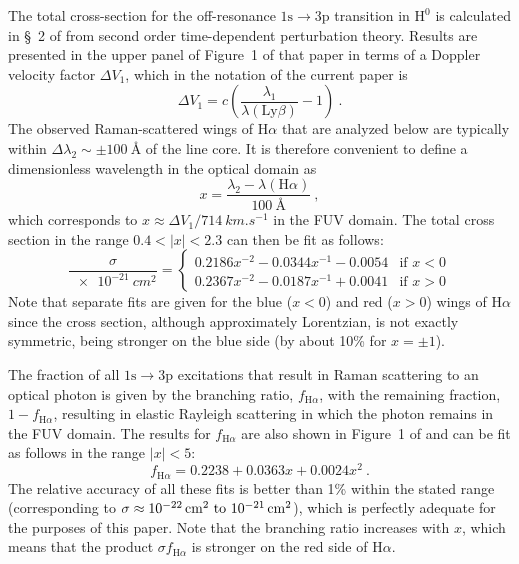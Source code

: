 \documentclass[twocolumn, times]{aastex63}
\newcommand*\chem[1]{\ensuremath{\mathrm{#1}}}
\newcommand\Config[1]{\ensuremath{\mathrm{#1}}}
\newcommand\ha{\ensuremath{\text{H}\alpha}}
\newcommand\lyb{\ensuremath{\text{Ly}\beta}}
\begin{document}
The total cross-section for the off-resonance \Config{1s \to 3p}
transition in \chem{H^0} is calculated in \S~2 of \citet{Chang:2015a}
from second order time-dependent perturbation theory. Results are
presented in the upper panel of Figure~1 of that paper in terms of a
Doppler velocity factor \(\Delta V_1\), which in the notation of the
current paper is
\begin{equation}
  \label{eq:chang-DeltaV1}
  \Delta V_1 = c \left( \frac{\lambda_1}{\lambda(\lyb)} - 1 \right) \ .
\end{equation}
The observed Raman-scattered wings of \ha{} that are analyzed below
are typically within \(\Delta\lambda_2 \sim \pm \SI{100}{\angstrom}\) of the line
core.  It is therefore convenient to define a dimensionless wavelength
in the optical domain as
\begin{equation}
  \label{eq:x-optical-def}
  x = \frac{\lambda_2 - \lambda(\ha)}{\SI{100}{\angstrom}} \ ,
\end{equation}
which corresponds to \(x \approx \Delta V_1 / \SI{714}{km.s^{-1}}\) in the FUV
domain.  The total cross section in the range \(0.4 < |x| < 2.3\) can
then be fit as follows:
\begin{equation}
  \label{eq:total-cross-section-fit}
  \frac{\sigma}{\SI{e-21}{cm^2}} =  
  \begin{cases}
    0.2186 x^{-2} - 0.0344 x^{-1} - 0.0054 & \text{if \(x < 0\)} \\
    0.2367 x^{-2} - 0.0187 x^{-1} + 0.0041 & \text{if \(x > 0\)} 
  \end{cases}
\end{equation}
Note that separate fits are given for the blue (\(x < 0\)) and red
(\(x > 0\)) wings of \ha{} since the cross section, although
approximately Lorentzian, is not exactly symmetric, being stronger on
the blue side (by about 10\% for \(x = \pm 1\)).

The fraction of all \Config{1s \to 3p} excitations that result in Raman
scattering to an optical photon is given by the branching ratio,
\(f_{\ha}\), with the remaining fraction, \(1 - f_{\ha}\), resulting
in elastic Rayleigh scattering in which the photon remains in the FUV
domain.  The results for \(f_{\ha}\) are also shown in Figure~1 of
\citet{Chang:2015a} and can be fit as follows in the range
\(|x| < 5\):
\begin{equation}
  \label{eq:fha-fit}
  f_{\ha} = 0.2238 + 0.0363 x + 0.0024 x^2 \ .
\end{equation}
The relative accuracy of all these fits is better than 1\% within the
stated range (corresponding to
\(\sigma \approx \text{\SIrange{e-22}{e-21}{cm^2}}\)), which is perfectly
adequate for the purposes of this paper.  Note that the branching
ratio increases with \(x\), which means that the product
\(\sigma f_{\ha} \) is stronger on the red side of \ha{}.
\end{document}
